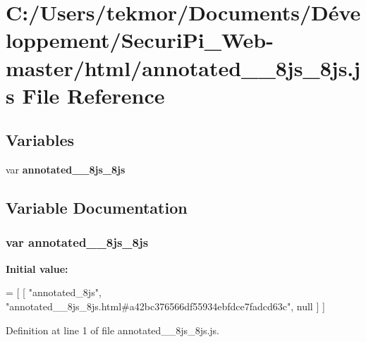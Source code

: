 \section{C\+:/\+Users/tekmor/\+Documents/\+Développement/\+Securi\+Pi\+\_\+\+Web-\/master/html/annotated\+\_\+\+\_\+8js\+\_\+8js.js File Reference}
\label{annotated____8js__8js_8js}
\subsection*{Variables}
\begin{DoxyCompactItemize}
\item 
var {\bf annotated\+\_\+\+\_\+8js\+\_\+8js}
\end{DoxyCompactItemize}


\subsection{Variable Documentation}
\subsubsection[{annotated\+\_\+\+\_\+8js\+\_\+8js}]{\setlength{\rightskip}{0pt plus 5cm}var annotated\+\_\+\+\_\+8js\+\_\+8js}\label{annotated____8js__8js_8js_a61eab4cd3b4f07c6cd1b19c750e8bc27}
{\bfseries Initial value\+:}
\begin{DoxyCode}
=
[
    [ \textcolor{stringliteral}{"annotated\_8js"}, \textcolor{stringliteral}{"annotated\_\_8js\_8js.html#a42bc376566df55934ebfdce7fadcd63c"}, null ]
]
\end{DoxyCode}


Definition at line 1 of file annotated\+\_\+\+\_\+8js\+\_\+8js.\+js.

